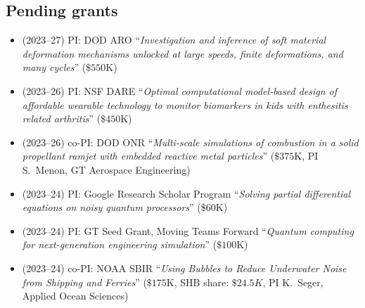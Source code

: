 \subsection{Pending grants}

\begin{itemize}
    \item (2023--27) PI: DOD ARO ``\textit{Investigation and inference of soft material deformation mechanisms unlocked at large speeds, finite deformations, and many cycles}'' ($\$550$K)
    \item (2023--26) PI: NSF DARE ``\textit{Optimal computational model-based design of affordable wearable technology to monitor biomarkers in kids with enthesitis related arthritis}'' ($\$450$K)
    \item (2023--26) co-PI: DOD ONR ``\textit{Multi-scale simulations of combustion in a solid propellant ramjet with embedded reactive metal particles}'' ($\$375$K, PI S.\ Menon, GT Aerospace Engineering)
    \item (2023--24) PI: Google Research Scholar Program ``\textit{Solving partial differential equations on noisy quantum processors}'' ($\$60$K)
    \item (2023--24) PI: GT Seed Grant, Moving Teams Forward ``\textit{Quantum computing for next-generation engineering simulation}'' ($\$100$K)
    \item (2023--24) co-PI: NOAA SBIR ``\textit{Using Bubbles to Reduce Underwater Noise from Shipping and Ferries}'' ($\$175$K, SHB share: $\$24.5K$, PI K.\ Seger, Applied Ocean Sciences)
\end{itemize}
